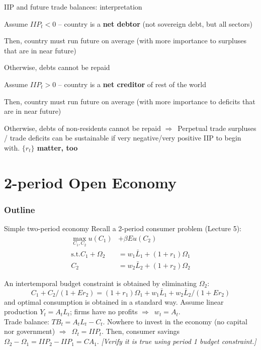 \documentclass{beamer}
\newcommand{\tb}[1]{{\color{blue}{\textbf{#1}}}}
\newenvironment{mytemize}
{\vfill\itemize[nolistsep,itemsep=\fill,label=\color{blue}{$\triangleright$}]}
  {\enditemize}
\newcommand{\rarr}{$\Rightarrow$\ }
\begin{document}
  \begin{frame}{IIP and future trade balances: interpretation}
	\begin{mytemize}
	  \item Assume $IIP_t<0$ -- country is a \textbf{net debtor} (not sovereign debt, but all sectors)
	  \item Then, country must run future \tb{trade surplus} on average (with more importance to surpluses that are in near future)
		\begin{mytemize}
		\item Otherwise, debts cannot be repaid
		\end{mytemize}
	  \item Assume $IIP_t>0$ -- country is a \textbf{net creditor} of rest of the world 
	  \item Then, country must run future \tb{trade deficits} on average (with more importance to deficits that are in near future)
		\begin{mytemize}
		\item Otherwise, debts of non-residents cannot be repaid
		\end{mytemize}
	\end{mytemize}
	\vfill
	\rarr Perpetual trade surpluses / trade deficits can be sustainable if very negative/very positive IIP to begin with. \textbf{$\{r_t\}$ matter, too}
  \end{frame}
\section{2-period Open Economy}
\begin{frame}
\frametitle{Outline}
\tableofcontents[currentsection]
\end{frame}

\begin{frame}{%
\protect\hypertarget{simple-two-period-economy}{%
Simple two-period economy}}
Recall a 2-period consumer problem (Lecture 5):
\begin{align*}
    \max_{C_1, C_2}  u(C_1) &+ \beta E u(C_2)  \\
    \text{s.t.} 
     C_1 +  \Omega_2  &= w_1 \bar L_1 + (1+r_1) \Omega_1  \\
     C_2 & =  w_2 \bar L_2  + (1+r_2) \Omega_2
  \end{align*}

An intertemporal budget constraint is obtained by eliminating
\(\Omega_2\):
\[C_1 + C_2/(1+ E r_2) = (1+r_1)\Omega_1 + w_1 \bar L_1 + w_2 \bar L_2/(1+E r_2)\]
and optimal consumption is obtained in a standard way. \vfill
Assume 
linear production \(Y_t = A_t L_t\); firms have no profits
\rarr \(w_t = A_t\). \\ Trade balance:
\(TB_t = A_t L_t - C_t\). \vfill 
Nowhere to invest in
the economy (no capital nor government) \rarr \(\Omega_t = IIP_t\).
Then, consumer savings \(\Omega_2 - \Omega_1 = IIP_2-IIP_1 = CA_1\).
\textit{[Verify it is true using period 1 budget constraint.]}

\end{frame}
\end{document}
